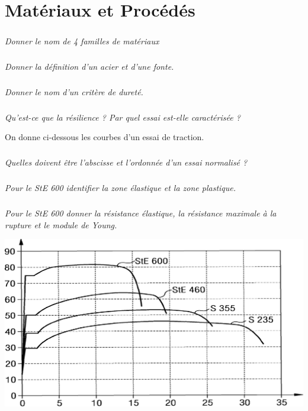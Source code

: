 \documentclass[10pt,fleqn]{article} %
\begin{document}

\vspace{8cm}
\pagestyle{fancy}
\thispagestyle{plain}


\def\columnseprulecolor{\color{ocre}}
\setlength{\columnseprule}{0.4pt} 

\section*{Matériaux et Procédés}
\begin{multicols}{2}
\subparagraph{}
\textit{Donner le nom de 4 familles de matériaux}

\subparagraph{}
\textit{Donner la définition d’un acier et d’une fonte.}

\subparagraph{}
\textit{Donner le nom d’un critère de dureté. }


\subparagraph{}
\textit{Qu’est-ce que la résilience ? Par quel essai est-elle caractérisée ?}

On donne ci-dessous les courbes d'un essai de traction. 
\subparagraph{}
\textit{Quelles doivent être l’abscisse et l’ordonnée d’un essai normalisé ?}

\subparagraph{}
\textit{Pour le StE 600 identifier la zone élastique et la zone plastique. }


\subparagraph{}
\textit{Pour le StE 600 donner la résistance élastique, la résistance maximale à la rupture et le module de Young.}

\end{multicols}
\begin{center}
\includegraphics[width=.8\textwidth]{images/courbe}
\end{center}
\end{document}
